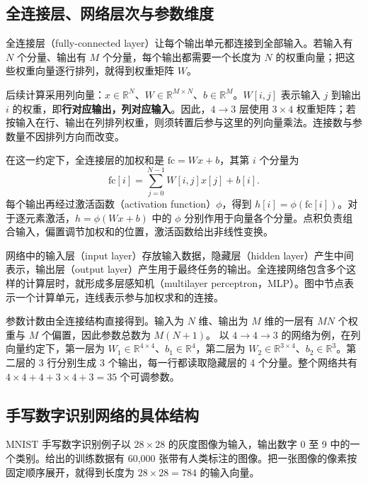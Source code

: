\subsection{全连接层、网络层次与参数维度}

全连接层（fully-connected layer）让每个输出单元都连接到全部输入。若输入有 $N$ 个分量、输出有 $M$ 个分量，每个输出都需要一个长度为 $N$ 的权重向量；把这些权重向量逐行排列，就得到权重矩阵 $W$。

\begin{definitionbox}[unbreakable,title={矩阵与索引约定}]
后续计算采用列向量：$x\in\mathbb{R}^N$、$W\in\mathbb{R}^{M\times N}$、$b\in\mathbb{R}^M$。$W[i,j]$ 表示输入 $j$ 到输出 $i$ 的权重，即\textbf{行对应输出，列对应输入}。因此，$4\to3$ 层使用 $3\times4$ 权重矩阵；若按输入在行、输出在列排列权重，则须转置后参与这里的列向量乘法。连接数与参数量不因排列方向而改变。
\end{definitionbox}

在这一约定下，全连接层的加权和是 $\mathrm{fc}=Wx+b$，其第 $i$ 个分量为
\begin{equation}
 \mathrm{fc}[i]=\sum_{j=0}^{N-1}W[i,j]x[j]+b[i].
 \label{l10:eq:fc-component}
\end{equation}
每个输出再经过激活函数（activation function）$\phi$，得到 $h[i]=\phi(\mathrm{fc}[i])$。对于逐元素激活，$h=\phi(Wx+b)$ 中的 $\phi$ 分别作用于向量各个分量。点积负责组合输入，偏置调节加权和的位置，激活函数给出非线性变换。

网络中的输入层（input layer）存放输入数据，隐藏层（hidden layer）产生中间表示，输出层（output layer）产生用于最终任务的输出。全连接网络包含多个这样的计算层时，就形成多层感知机（multilayer perceptron，MLP）。图中节点表示一个计算单元，连线表示参与加权求和的连接。

参数计数由全连接结构直接得到。输入为 $N$ 维、输出为 $M$ 维的一层有 $MN$ 个权重与 $M$ 个偏置，因此参数总数为 $M(N+1)$。
以 $4\to4\to3$ 的网络为例，在列向量约定下，第一层为 $W_1\in\mathbb{R}^{4\times4}$、$b_1\in\mathbb{R}^4$，第二层为 $W_2\in\mathbb{R}^{3\times4}$、$b_2\in\mathbb{R}^3$。第二层的 3 行分别生成 3 个输出，每一行都读取隐藏层的 4 个分量。整个网络共有 $4\times4+4+3\times4+3=35$ 个可调参数。

\subsection{手写数字识别网络的具体结构}

MNIST 手写数字识别例子以 $28\times28$ 的灰度图像为输入，输出数字 0 至 9 中的一个类别。给出的训练数据有 60,000 张带有人类标注的图像。把一张图像的像素按固定顺序展开，就得到长度为 $28\times28=784$ 的输入向量。

